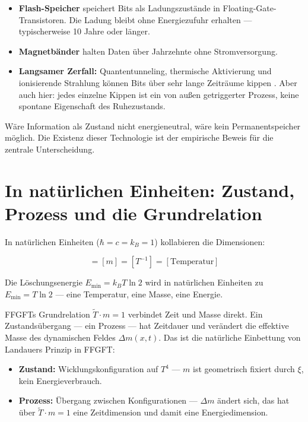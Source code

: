 \begin{itemize}
  \item \textbf{Flash-Speicher} speichert Bits als Ladungszustände in
        Floating-Gate-Transistoren. Die Ladung bleibt ohne Energiezufuhr
        erhalten — typischerweise 10 Jahre oder länger.
  \item \textbf{Magnetbänder} halten Daten über Jahrzehnte ohne
        Stromversorgung.
  \item \textbf{Langsamer Zerfall:} Quantentunneling, thermische
        Aktivierung und ionisierende Strahlung können Bits über sehr
        lange Zeiträume kippen \cite{Bez2003}. Aber auch hier: jedes
        einzelne Kippen ist ein von außen getriggerter Prozess, keine
        spontane Eigenschaft des Ruhezustands.
\end{itemize}

Wäre Information als Zustand nicht energieneutral, wäre kein Permanentspeicher
möglich. Die Existenz dieser Technologie ist der empirische Beweis für die
zentrale Unterscheidung.

\section{In natürlichen Einheiten: Zustand, Prozess und die Grundrelation}

In natürlichen Einheiten ($\hbar = c = k_B = 1$) kollabieren die
Dimensionen:

\begin{equation}
  [E] = [m] = [T^{-1}] = [\text{Temperatur}]
\end{equation}

Die Löschungsenergie $E_{\min} = k_B T \ln 2$ wird in natürlichen Einheiten
zu $E_{\min} = T \ln 2$ — eine Temperatur, eine Masse, eine Energie.

FFGFTs Grundrelation $\tilde{T} \cdot m = 1$ verbindet Zeit und Masse direkt.
Ein Zustandsübergang — ein Prozess — hat Zeitdauer und verändert die effektive
Masse des dynamischen Feldes $\Delta m(x,t)$. Das ist die natürliche Einbettung
von Landauers Prinzip in FFGFT:

\begin{itemize}
  \item \textbf{Zustand:} Wicklungskonfiguration auf $T^4$ — $m$ ist
        geometrisch fixiert durch $\xi$, kein Energieverbrauch.
  \item \textbf{Prozess:} Übergang zwischen Konfigurationen — $\Delta m$
        ändert sich, das hat über $\tilde{T} \cdot m = 1$ eine
        Zeitdimension und damit eine Energiedimension.
\end{itemize}

